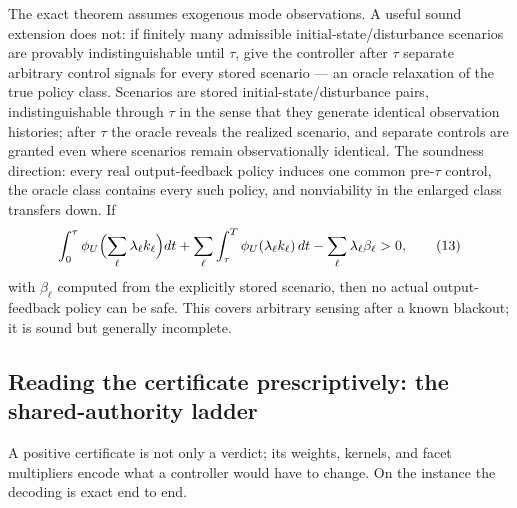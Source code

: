 \documentclass[10pt,twocolumn]{article}
\theoremstyle{plain}
\theoremstyle{definition}
\theoremstyle{remark}
\begin{document}
The exact theorem assumes exogenous mode observations. A useful sound
extension does not: if finitely many admissible initial-state/disturbance
scenarios are provably indistinguishable until \(\tau\), give the controller
after \(\tau\) separate arbitrary control signals for every stored scenario
--- an oracle relaxation of the true policy class. Scenarios are stored
initial-state/disturbance pairs, indistinguishable through \(\tau\) in
the sense that they generate identical observation histories; after
\(\tau\) the oracle reveals the realized scenario, and separate controls
are granted even where scenarios remain observationally identical. The
soundness direction: every real output-feedback policy induces one common
pre-\(\tau\) control, the oracle class contains every such policy, and
nonviability in the enlarged class transfers down. If
\[
\int_0^\tau \phi_U\Bigl(\sum_\ell \lambda_\ell k_\ell\Bigr) dt
+ \sum_\ell \int_\tau^T \phi_U(\lambda_\ell k_\ell)\, dt
- \sum_\ell \lambda_\ell \beta_\ell > 0,
\tag{13}
\]
with \(\beta_\ell\) computed from the explicitly stored scenario, then no
actual output-feedback policy can be safe. This covers arbitrary sensing
after a known blackout; it is sound but generally incomplete.

\subsection{Reading the certificate prescriptively: the shared-authority ladder}\label{ladder}

A positive certificate is not only a verdict; its weights, kernels, and
facet multipliers encode what a controller would have to change. On the
instance the decoding is exact end to end.
\end{document}
